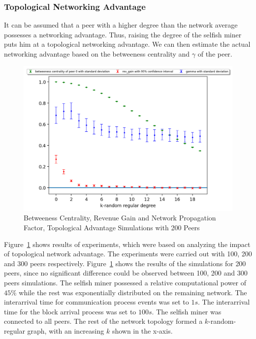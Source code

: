 \subsubsection{Topological Networking Advantage}
It can be assumed that a peer with a higher degree than the network average possesses a networking advantage. Thus, raising the degree of the selfish miner puts him at a topological networking advantage. We can then estimate the actual networking advantage based on the betweeness centrality and $\gamma$ of the peer. 
\begin{figure}[ht]
		\includegraphics[width=\textwidth]{figures/full_sm_multi_degree_200rev_and_bpr_per_peer.png}
		
\caption{Betweeness Centrality, Revenue Gain and Network Propagation Factor, Topological Advantage Simulations with 200 Peers}
\label{fig:top_adv200}
\end{figure}

Figure~\ref{fig:top_adv200} shows results of experiments, which were based on analyzing the impact of topological network advantage. The experiments were carried out with 100, 200 and 300 peers respectively. Figure~\ref{fig:top_adv200} shows the results of the simulations for 200 peers, since no significant difference could be observed between 100, 200 and 300 peers simulations. The selfish miner possessed a relative computational power of $45\% $ while the rest was exponentially distributed on the remaining network. The interarrival time for communication process events was set to $1s$. The interarrival time for the block arrival process was set to $100s$. The selfish miner was connected to all peers. The rest of the network topology formed a $k$-random-regular graph, with an increasing $k$ shown in the x-axis.

